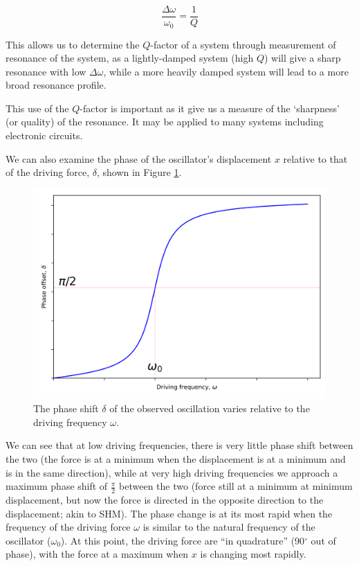 \documentclass[
]{book}
\begin{document}
\begin{equation}
\frac{\Delta \omega}{\omega_0} = \frac{1}{Q}
\label{eq:ch5-resonancequality1}
\end{equation}

This allows us to determine the \(Q\)-factor of a system through measurement of resonance of the system, as a lightly-damped system (high \(Q\)) will give a sharp resonance with low \(\Delta \omega\), while a more heavily damped system will lead to a more broad resonance profile.

This use of the \(Q\)-factor is important as it give us a measure of the `sharpness' (or quality) of the resonance. It may be applied to many systems including electronic circuits.

We can also examine the phase of the oscillator's displacement \(x\) relative to that of the driving force, \(\delta\), shown in Figure \ref{fig:ch5-resonancephaseshift1}.

\begin{figure}

{\centering \includegraphics[width=0.7\linewidth]{visualisations/ch5-forcedosc3} 

}

\caption{The phase shift $\delta$ of the observed oscillation varies relative to the driving frequency $\omega$.}\label{fig:ch5-resonancephaseshift1}
\end{figure}

We can see that at low driving frequencies, there is very little phase shift between the two (the force is at a minimum when the displacement is at a minimum and is in the same direction), while at very high driving frequencies we approach a maximum phase shift of \(\frac{\pi}{2}\) between the two (force still at a minimum at minimum displacement, but now the force is directed in the opposite direction to the displacement; akin to SHM). The phase change is at its most rapid when the frequency of the driving force \(\omega\) is similar to the natural frequency of the oscillator (\(\omega_0\)). At this point, the driving force are ``in quadrature'' (90\(^\circ\) out of phase), with the force at a maximum when \(x\) is changing most rapidly.
\end{document}
